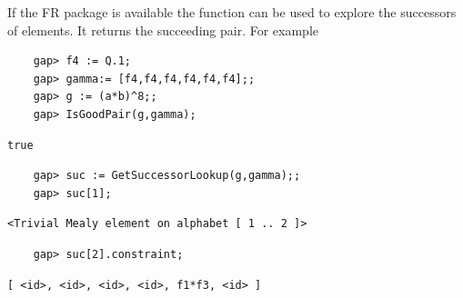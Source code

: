 \documentclass[a4paper,11pt]{amsart}
\begin{document}
If the FR package is available
the function  can be used to explore the
successors of elements. It returns the succeeding pair. For example
 \begin{lstlisting}
    gap> f4 := Q.1;
    gap> gamma:= [f4,f4,f4,f4,f4,f4];;
    gap> g := (a*b)^8;;
    gap> IsGoodPair(g,gamma);
\end{lstlisting}
\begin{verbatim}
true
\end{verbatim} 
\begin{lstlisting}
    gap> suc := GetSuccessorLookup(g,gamma);;    
    gap> suc[1];
\end{lstlisting}
\begin{verbatim}
<Trivial Mealy element on alphabet [ 1 .. 2 ]>
\end{verbatim} 
\begin{lstlisting}
    gap> suc[2].constraint;
\end{lstlisting}
\begin{verbatim}
[ <id>, <id>, <id>, <id>, f1*f3, <id> ]
\end{verbatim} 





\appendix
% 
%
\end{document}
